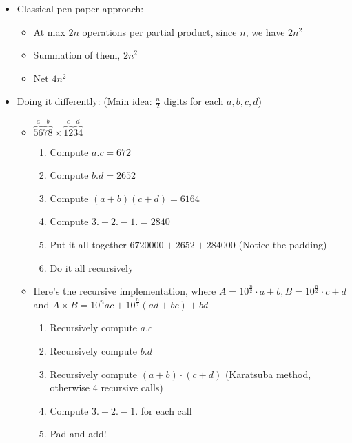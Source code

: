\documentclass[a4paper
]{article}
\providecommand{\tightlist}{%
  \setlength{\itemsep}{0pt}\setlength{\parskip}{0pt}}
\begin{document}
\begin{itemize}
\item
  Classical pen-paper approach:

  \begin{itemize}
  \tightlist
  \item
    At max {\(2n\)} operations per partial product, since {\(n\)}, we
    have {\(2n^{2}\)}
  \item
    Summation of them, {\(2n^{2}\)}
  \item
    Net {\(4n^{2}\)}
  \end{itemize}
\item
  Doing it differently: (Main idea: {\(\frac{n}{2}\)} digits for each
  {\(a,b,c,d\)})

  \begin{itemize}
  \tightlist
  \item
    {\(\overset{a}{\overbrace{56}}\overset{b}{\overbrace{78}} \times \overset{c}{\overbrace{12}}\overset{d}{\overbrace{34}}\)}

    \begin{enumerate}
    \tightlist
    \item
      Compute {\(a.c = 672\)}
    \item
      Compute {\(b.d = 2652\)}
    \item
      Compute {\((a + b)(c + d) = 6164\)}
    \item
      Compute {\(\boxed{3. - 2. - 1.} = 2840\)}
    \item
      Put it all together {\(6720000 + 2652 + 284000\)} (Notice the
      padding)
    \item
      Do it all recursively
    \end{enumerate}
  \item
    Here's the recursive implementation, where
    {\(A = 10^{\frac{n}{2}} \cdot a + b,B = 10^{\frac{n}{2}} \cdot c + d\)}
    and {\(A \times B = 10^{n}ac + 10^{\frac{n}{2}}(ad + bc) + bd\)}

    \begin{enumerate}
    \tightlist
    \item
      Recursively compute {\(a.c\)}
    \item
      Recursively compute {\(b.d\)}
    \item
      Recursively compute {\((a + b) \cdot (c + d)\)} (Karatsuba method,
      otherwise 4 recursive calls)
    \item
      Compute {\(\boxed{3. - 2. - 1.}\)} for each call
    \item
      Pad and add!
    \end{enumerate}
  \end{itemize}
\end{itemize}
\end{document}
